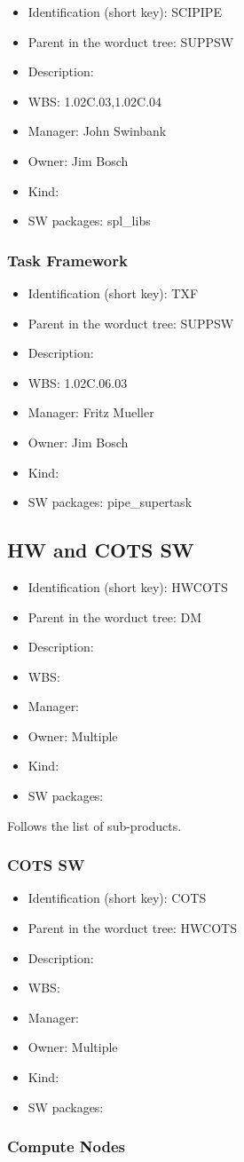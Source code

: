 \begin{itemize}\item Identification (short key): SCIPIPE
\item Parent in the worduct tree: SUPPSW
\item Description: 
\item WBS: 1.02C.03,1.02C.04
\item Manager: John Swinbank
\item Owner: Jim Bosch
\item Kind:
\item SW packages: spl\_libs
\end{itemize}\subsubsection{Task Framework}
\begin{itemize}\item Identification (short key): TXF
\item Parent in the worduct tree: SUPPSW
\item Description: 
\item WBS: 1.02C.06.03
\item Manager: Fritz Mueller
\item Owner: Jim Bosch
\item Kind:
\item SW packages: pipe\_supertask
\end{itemize}\subsection{HW and COTS SW}
\begin{itemize}\item Identification (short key): HWCOTS
\item Parent in the worduct tree: DM
\item Description: 
\item WBS: 
\item Manager: 
\item Owner: Multiple
\item Kind:
\item SW packages: 
\end{itemize}Follows the list of sub-products.\subsubsection{COTS SW}
\begin{itemize}\item Identification (short key): COTS
\item Parent in the worduct tree: HWCOTS
\item Description: 
\item WBS: 
\item Manager: 
\item Owner: Multiple
\item Kind:
\item SW packages: 
\end{itemize}\subsubsection{Compute Nodes}
